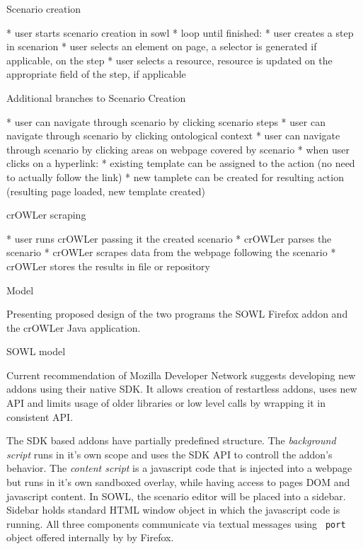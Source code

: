 \secc Scenario creation

\begitems
  * user starts scenario creation in sowl
  * loop until finished:
  \begitems
    * user creates a step in scenarion
    * user selects an element on page, a selector is generated if applicable,
      on the step
    * user selects a resource, resource is updated on the appropriate field of
      the step, if applicable
  \enditems
\enditems


\secc Additional branches to Scenario Creation

\begitems
  * user can navigate through scenario by clicking scenario steps
  * user can navigate through scenario by clicking ontological context
  * user can navigate through scenario by clicking areas on webpage covered by scenario
  * when user clicks on a hyperlink: 
  \begitems
    * existing template can be assigned to the action (no need to actually
      follow the link)
    * new tamplete can be created for resulting action (resulting page loaded,
      new template created)
  \enditems
\enditems

\secc crOWLer scraping

\begitems
  * user runs crOWLer passing it the created scenario
  * crOWLer parses the scenario
  * crOWLer scrapes data from the webpage following the scenario
  * crOWLer stores the results in file or repository
\enditems


\sec Model

Presenting proposed design of the two programs the SOWL Firefox addon and the
crOWLer Java application. 

\secc SOWL model

Current recommendation of Mozilla Developer Network suggests developing new
addons using their native SDK. It allows creation of restartless addons, uses 
new API and limits usage of older libraries or low level calls by wrapping it 
in consistent API. 

The SDK based addons have partially predefined structure. The {\em background script}
runs in it's own scope and uses the SDK API to controll the addon's behavior.
The {\em content script} is a javascript code that is injected into a webpage
but runs in it's own sandboxed overlay, while having access to pages DOM and
javascript content. In SOWL, the scenario editor will be placed into a sidebar.
Sidebar holds standard HTML window object in which the javascript code is
running.  All three components communicate via textual messages using {\tt
port} object offered internally by by Firefox. 

